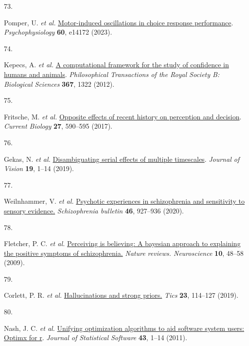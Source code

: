 \documentclass[
]{article}
\newlength{\cslhangindent}
\newlength{\csllabelwidth}
\newlength{\cslentryspacingunit} %
\newenvironment{CSLReferences}[2] %
 {%
  \setlength{\parindent}{0pt}
  \ifodd #1
  \let\oldpar\par
  \def\par{\hangindent=\cslhangindent\oldpar}
  \fi
  \setlength{\parskip}{#2\cslentryspacingunit}
 }%
 {}
\newcommand{\CSLLeftMargin}[1]{\parbox[t]{\csllabelwidth}{#1}}
\newcommand{\CSLRightInline}[1]{\parbox[t]{\linewidth - \csllabelwidth}{#1}\break}
\begin{document}
\begin{CSLReferences}{0}{0}
\leavevmode{}%
\CSLLeftMargin{73. }%
\CSLRightInline{Pomper, U. \emph{et al.}
\href{https://doi.org/10.1111/PSYP.14172}{Motor-induced oscillations in
choice response performance}. \emph{Psychophysiology} \textbf{60},
e14172 (2023).}

\leavevmode{}%
\CSLLeftMargin{74. }%
\CSLRightInline{Kepecs, A. \emph{et al.}
\href{https://doi.org/10.1098/RSTB.2012.0037}{A computational framework
for the study of confidence in humans and animals}. \emph{Philosophical
Transactions of the Royal Society B: Biological Sciences} \textbf{367},
1322 (2012).}

\leavevmode{}%
\CSLLeftMargin{75. }%
\CSLRightInline{Fritsche, M. \emph{et al.}
\href{https://doi.org/10.1016/j.cub.2017.01.006}{Opposite effects of
recent history on perception and decision}. \emph{Current Biology}
\textbf{27}, 590--595 (2017).}

\leavevmode{}%
\CSLLeftMargin{76. }%
\CSLRightInline{Gekas, N. \emph{et al.}
\href{https://doi.org/10.1167/19.6.24}{Disambiguating serial effects of
multiple timescales}. \emph{Journal of Vision} \textbf{19}, 1--14
(2019).}

\leavevmode{}%
\CSLLeftMargin{77. }%
\CSLRightInline{Weilnhammer, V. \emph{et al.}
\href{https://www.ncbi.nlm.nih.gov/pubmed/32090246}{Psychotic
experiences in schizophrenia and sensitivity to sensory evidence.}
\emph{Schizophrenia bulletin} \textbf{46}, 927--936 (2020).}

\leavevmode{}%
\CSLLeftMargin{78. }%
\CSLRightInline{Fletcher, P. C. \emph{et al.}
\href{https://doi.org/10.1038/nrn2536}{Perceiving is believing: A
bayesian approach to explaining the positive symptoms of schizophrenia.}
\emph{Nature reviews. Neuroscience} \textbf{10}, 48--58 (2009).}

\leavevmode{}%
\CSLLeftMargin{79. }%
\CSLRightInline{Corlett, P. R. \emph{et al.}
\href{https://doi.org/10.1016/j.tics.2018.12.001}{Hallucinations and
strong priors.} \emph{Tics} \textbf{23}, 114--127 (2019).}

\leavevmode{}%
\CSLLeftMargin{80. }%
\CSLRightInline{Nash, J. C. \emph{et al.}
\href{https://doi.org/10.18637/JSS.V043.I09}{Unifying optimization
algorithms to aid software system users: Optimx for r}. \emph{Journal of
Statistical Software} \textbf{43}, 1--14 (2011).}


\end{CSLReferences}
\end{document}
